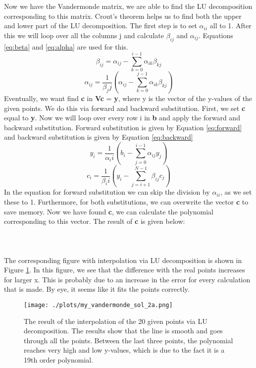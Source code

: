 Now we have the Vandermonde matrix, we are able to find the LU decomposition corresponding to this matrix. Crout's theorem helps us to find both the upper and lower part of the LU decomposition. The first step is to set $\alpha_{ii}$ all to 1. After this we will loop over all the columns j and calculate $\beta_{ij}$ and $\alpha_{ij}$. Equations \ref{eq:beta} and \ref{eq:alpha} are used for this.
\begin{equation}\label{eq:beta}
    \beta_{ij} = \alpha_{ij} - \sum^{i-1}_{k=0}{\alpha_{ik}\beta_{kj}}
\end{equation}
\begin{equation}\label{eq:alpha}
    \alpha_{ij} = \frac{1}{\beta_jj} \left(\alpha_{ij} - \sum^{j-1}_{k=0}{\alpha_{ik}\beta_{kj}}\right)
\end{equation}
Eventually, we want find \textbf{c} in \textbf{Vc} = \textbf{y}, where y is the vector of the y-values of the given points. We do this via forward and backward substitution. First, we set \textbf{c} equal to \textbf{y}. Now we will loop over every row i in \textbf{b} and apply the forward and backward substitution. Forward substitution is given by Equation \ref{eq:forward} and backward substitution is given by Equation \ref{eq:backward}
\begin{equation}\label{eq:forward}
    y_i = \frac{1}{\alpha_ii} \left(b_i - \sum^{i-1}_{j=0}{\alpha_{ij}y_{j}}\right)
\end{equation}
\begin{equation}\label{eq:backward}
    c_i = \frac{1}{\beta_ii} \left(y_i - \sum^{N-1}_{j=i+1}{\beta_{ij}c_{j}}\right)
\end{equation}
In the equation for forward substitution we can skip the division by $\alpha_{ii}$, as we set these to 1. Furthermore, for both substitutions, we can overwrite the vector \textbf{c} to save memory. Now we have found \textbf{c}, we can calculate the polynomial corresponding to this vector. The result of \textbf{c} is given below: 
\\\\

\\\\
The corresponding figure with interpolation via LU decomposition is shown in Figure \ref{fig:2a}. In this figure, we see that the difference with the real points increases for larger x. This is probably due to an increase in the error for every calculation that is made. By eye, it seems like it fits the points correctly. 

\begin{figure}[h!]
  \centering
  \texttt{[image: ./plots/my\_vandermonde\_sol\_2a.png]}
  \caption{The result of the interpolation of the 20 given points via LU decomposition. The results show that the line is smooth and goes through all the points. Between the last three points, the polynomial reaches very high and low y-values, which is due to the fact it is a 19th order polynomial.}
  \label{fig:2a}
\end{figure}

